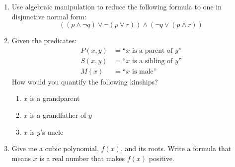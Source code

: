 \documentclass[12pt]{article}
\begin{document}
\begin{enumerate}

\item Use algebraic manipulation to reduce the following formula to one in disjunctive normal form:
$$((p \wedge \neg q) \vee \neg (p \vee r)) \wedge (\neg q \vee (p \wedge r))$$

\vspace{100pt}

\item Given the predicates:
\begin{align*}
	P(x, y) &= \text{``$x$ is a parent of $y$''} \\
	S(x, y) &= \text{``$x$ is a sibling of 	$y$''} \\
	M(x) &= \text{``$x$ is male''}
\end{align*}
How would you quantify the following kinships?
\begin{enumerate}	
	\item $x$ is a grandparent
	
	\item $x$ is a grandfather of $y$
	
	\item $x$ is $y$'s uncle
\end{enumerate}

\vspace{100pt}

\item Give me a cubic polynomial, $f(x)$, and its roots. Write a formula that means $x$ is a real number that makes $f(x)$ positive.

\end{enumerate}









\pagebreak
\end{document}
